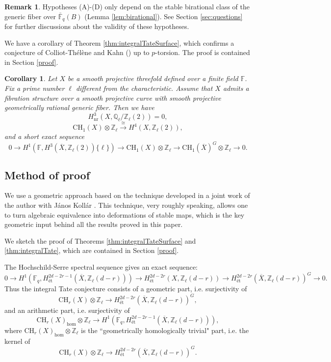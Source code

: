 \documentclass{amsart}
\newtheorem{cor}[theorem]{Corollary}
\theoremstyle{definition}
\newtheorem{rem}[theorem]{Remark}
\theoremstyle{remark}
\newcommand{\mbb}{\mathbb}
\newcommand{\FF}{\mbb{F}}
\newcommand{\QQ}{\mbb{Q}}
\newcommand{\ZZ}{\mbb{Z}}
\newcommand{\et}{\text{\'et}}
\begin{document}
\begin{rem}
    Hypotheses (A)-(D) only depend on the stable birational class of the generic fiber over $\bar{\FF}_q(B)$ (Lemma \ref{lem:birational}).
    See Section \ref{sec:questions} for further discussions about the validity of these hypotheses.
\end{rem}


We have a corollary of Theorem \ref{thm:integralTateSurface}, which confirms a conjecture of Colliot-Th\'el\`ene and Kahn (\cite[Conjecture 5.8]{CTKahnCycleCodim2}) up to $p$-torsion. The proof is contained in Section \ref{proof}.

\begin{cor}\label{cor:CTK}
Let $X$ be a smooth projective threefold defined over a finite field $\FF$.
Fix a prime number $\ell$ different from the characteristic.
Assume that $X$ admits a fibration structure over a smooth projective curve with smooth projective geometrically rational generic fiber.
Then we have 
\[
H^3_{\text{nr}}(X, \QQ_\ell/\ZZ_\ell(2))=0,
\]
\[
\text{CH}_1(X) \otimes \ZZ_\ell \xrightarrow{\cong} H^4(X, \ZZ_\ell(2)),
\]
and a short exact sequence
\[
0 \to H^1(\FF, H^3(\overline{X}, \ZZ_\ell(2))\{\ell\}) \to \text{CH}_1(X) \otimes \ZZ_\ell \to \text{CH}_1(\overline{X})^G \otimes \ZZ_\ell \to 0.
\]
\end{cor}








\subsection{Method of proof}
We use a geometric approach based on the technique developed in a joint work of the author with J\'anos Koll\'ar \cite{Kollar_Tian}.
This technique, very roughly speaking, allows one to turn algebraic equivalence into deformations of stable maps, which is the key geometric input behind all the results proved in this paper.
 
We sketch the proof of Theorems \ref{thm:integralTateSurface} and \ref{thm:integralTate}, which are contained in Section \ref{proof}.

The Hochschild-Serre spectral sequence gives an exact sequence:
\[
0 \to H^1(\FF_q, H^{2d-2r-1}_\et(\overline{X}, \ZZ_\ell(d-r))) \to H^{2d-2r}_\et(X, \ZZ_\ell(d-r)) \to H^{2d-2r}_\et(\overline{X}, \ZZ_\ell(d-r))^G \to 0.
\]
Thus the integral Tate conjecture consists of a geometric part, i.e. surjectivity of 
\[
\text{CH}_r(X) \otimes \ZZ_\ell \to H^{2d-2r}_\et(\overline{X}, \ZZ_\ell(d-r))^G,
\]
and an arithmetic part, i.e. surjectivity of
\[
\text{CH}_r(X)_\text{hom}\otimes \ZZ_\ell \to H^1(\FF_q, H^{2d-2r-1}_\et(\overline{X}, \ZZ_\ell(d-r))),
\]
where $\text{CH}_r(X)_\text{hom}\otimes \ZZ_\ell$ is the ``geometrically homologically trivial" part, i.e. the kernel of 
\[
\text{CH}_r(X) \otimes \ZZ_\ell \to H^{2d-2r}_\et(\overline{X}, \ZZ_\ell(d-r))^G.
\]
\end{document}
